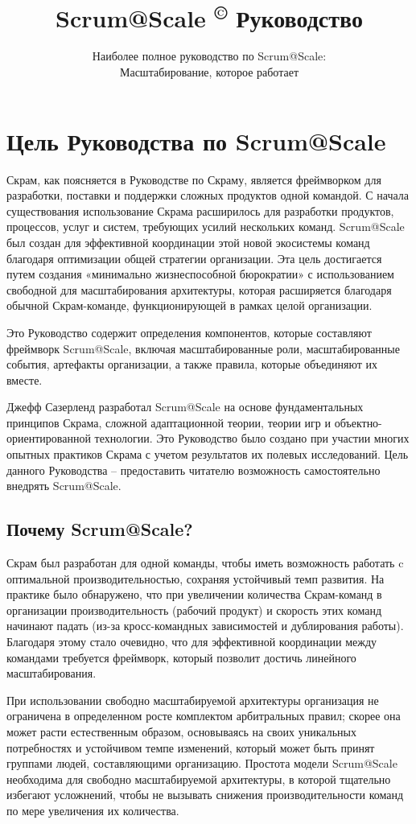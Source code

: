 \documentclass[12pt,a4paper,parskip=full]{scrartcl}
\title{\Huge{\color{red}\textbf{ Scrum@Scale 
\textsuperscript{\copyright} 
Руководство}}}
\subtitle{\color{gray}Наиболее полное руководство по Scrum@Scale:\\ Масштабирование, которое работает}
\date{}
\begin{document}

\section{Цель Руководства по Scrum@Scale}

Скрам, как поясняется в Руководстве по Скраму, является фреймворком для разработки, поставки и поддержки сложных продуктов одной командой. С начала существования использование Скрама расширилось для разработки продуктов, процессов, услуг и систем, требующих усилий нескольких команд. Scrum@Scale был создан для эффективной координации этой новой экосистемы команд благодаря оптимизации общей стратегии организации. Эта цель достигается путем создания «минимально жизнеспособной бюрократии» с использованием свободной для масштабирования архитектуры, которая расширяется благодаря обычной Скрам-команде, функционирующей в рамках целой организации.
 
Это Руководство содержит определения компонентов, которые составляют фреймворк Scrum@Scale, включая масштабированные роли, масштабированные события, артефакты организации, а также правила, которые объединяют их вместе.
 
Джефф Сазерленд разработал Scrum@Scale на основе фундаментальных принципов Скрама, сложной адаптационной теории, теории игр и объектно-ориентированной технологии. Это Руководство было создано при участии многих опытных практиков Скрама с учетом результатов их полевых исследований. Цель данного Руководства – предоставить читателю возможность самостоятельно внедрять Scrum@Scale.

\subsection{Почему Scrum@Scale?}

Скрам был разработан для одной команды, чтобы иметь возможность работать c оптимальной производительностью, сохраняя устойчивый темп развития. На практике было обнаружено, что при увеличении количества Скрам-команд в организации производительность (рабочий продукт) и скорость этих команд начинают падать (из-за кросс-командных зависимостей и дублирования работы). Благодаря этому стало очевидно, что для эффективной координации между командами требуется фреймворк, который позволит достичь линейного масштабирования.
 
При использовании свободно масштабируемой архитектуры организация не ограничена в определенном росте комплектом арбитральных правил; скорее она может расти естественным образом, основываясь на своих уникальных потребностях и устойчивом темпе изменений, который может быть принят группами людей, составляющими организацию. Простота модели Scrum@Scale необходима для свободно масштабируемой архитектуры, в которой тщательно избегают усложнений, чтобы не вызывать снижения производительности команд по мере увеличения их количества.
 
\end{document}
